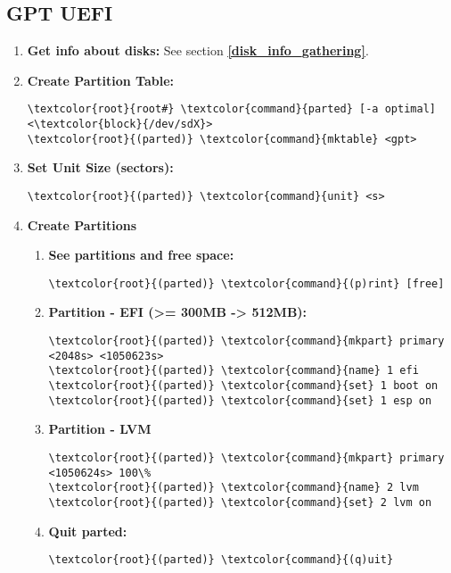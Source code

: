 \documentclass[10pt, a4paper, onecolumn, openany]{book} %
\begin{document}
\subsection{GPT UEFI}
\begin{enumerate}

    \item \textbf{Get info about disks:}
\newline See section \underline{\textbf{\ref{disk_info_gathering}}}.

    \item \textbf{Create Partition Table:}
\begin{Verbatim}[commandchars=\\\{\}]
\textcolor{root}{root#} \textcolor{command}{parted} [-a optimal] <\textcolor{block}{/dev/sdX}>
\textcolor{root}{(parted)} \textcolor{command}{mktable} <gpt>
\end{Verbatim}

    \item \textbf{Set Unit Size (sectors):}
\begin{Verbatim}[commandchars=\\\{\}]
\textcolor{root}{(parted)} \textcolor{command}{unit} <s>
\end{Verbatim}

    \item \textbf{Create Partitions}
    \begin{enumerate}
        \item \textbf{See partitions and free space:}
\begin{Verbatim}[commandchars=\\\{\}]
\textcolor{root}{(parted)} \textcolor{command}{(p)rint} [free] 
\end{Verbatim}        

        \item \textbf{Partition - EFI (>= 300MB -> 512MB):}
\begin{Verbatim}[commandchars=\\\{\}]
\textcolor{root}{(parted)} \textcolor{command}{mkpart} primary <2048s> <1050623s>
\textcolor{root}{(parted)} \textcolor{command}{name} 1 efi
\textcolor{root}{(parted)} \textcolor{command}{set} 1 boot on
\textcolor{root}{(parted)} \textcolor{command}{set} 1 esp on
\end{Verbatim}
        \item \textbf{Partition - LVM}
\begin{Verbatim}[commandchars=\\\{\}]
\textcolor{root}{(parted)} \textcolor{command}{mkpart} primary <1050624s> 100\%
\textcolor{root}{(parted)} \textcolor{command}{name} 2 lvm
\textcolor{root}{(parted)} \textcolor{command}{set} 2 lvm on
\end{Verbatim}
        \item \textbf{Quit parted:}
\begin{Verbatim}[commandchars=\\\{\}]
\textcolor{root}{(parted)} \textcolor{command}{(q)uit}
\end{Verbatim}
    \end{enumerate}


\end{enumerate}
\end{document}
